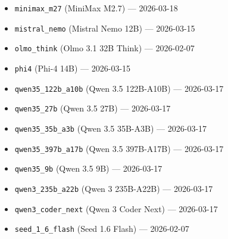 \begin{small}
\begin{itemize}
  \item \texttt{minimax\_m27} (MiniMax M2.7) --- 2026-03-18
  \item \texttt{mistral\_nemo} (Mistral Nemo 12B) --- 2026-03-15
  \item \texttt{olmo\_think} (Olmo 3.1 32B Think) --- 2026-02-07
  \item \texttt{phi4} (Phi-4 14B) --- 2026-03-15
  \item \texttt{qwen35\_122b\_a10b} (Qwen 3.5 122B-A10B) --- 2026-03-17
  \item \texttt{qwen35\_27b} (Qwen 3.5 27B) --- 2026-03-17
  \item \texttt{qwen35\_35b\_a3b} (Qwen 3.5 35B-A3B) --- 2026-03-17
  \item \texttt{qwen35\_397b\_a17b} (Qwen 3.5 397B-A17B) --- 2026-03-17
  \item \texttt{qwen35\_9b} (Qwen 3.5 9B) --- 2026-03-17
  \item \texttt{qwen3\_235b\_a22b} (Qwen 3 235B-A22B) --- 2026-03-17
  \item \texttt{qwen3\_coder\_next} (Qwen 3 Coder Next) --- 2026-03-17
  \item \texttt{seed\_1\_6\_flash} (Seed 1.6 Flash) --- 2026-02-07
\end{itemize}\end{small}
